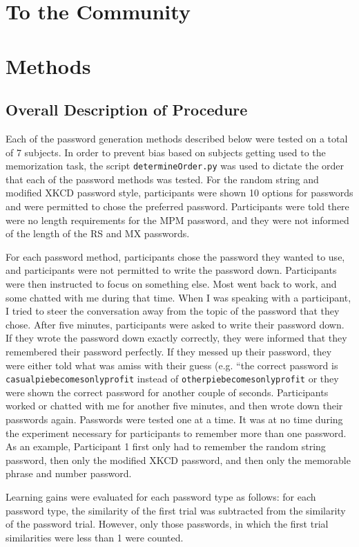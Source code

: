 \documentclass{article}
\begin{document}
\section*{To the Community}

\section*{Methods}
\subsection*{Overall Description of Procedure}
Each of the password generation methods described below were tested on a total of 7 subjects. In order to prevent bias based on subjects getting used to the memorization task, the script \texttt{determineOrder.py} was used to dictate the order that each of the password methods was tested. For the random string and modified XKCD password style, participants were shown 10 options for passwords and were permitted to chose the preferred password. Participants were told there were no length requirements for the MPM password, and they were not informed of the length of the RS and MX passwords.

For each password method, participants chose the password they wanted to use, and participants were not permitted to write the password down. Participants were then instructed to focus on something else. Most went back to work, and some chatted with me during that time. When I was speaking with a participant, I tried to steer the conversation away from the topic of the password that they chose. After five minutes, participants were asked to write their password down. If they wrote the password down exactly correctly, they were informed that they remembered their password perfectly. If they messed up their password, they were either told what was amiss with their guess (e.g. ``the correct password is \texttt{casualpiebecomesonlyprofit} instead of \texttt{otherpiebecomesonlyprofit} or they were shown the correct password for another couple of seconds. Participants worked or chatted with me for another five minutes, and then wrote down their passwords again. Passwords were tested one at a time. It was at no time during the experiment necessary for participants to remember more than one password. As an example, Participant 1 first only had to remember the random string password, then only the modified XKCD password, and then only the memorable phrase and number password.

Learning gains were evaluated for each password type as follows: for each password type, the similarity of the first trial was subtracted from the similarity of the password trial. However, only those passwords, in which the first trial similarities were less than 1 were counted. 
\end{document}
